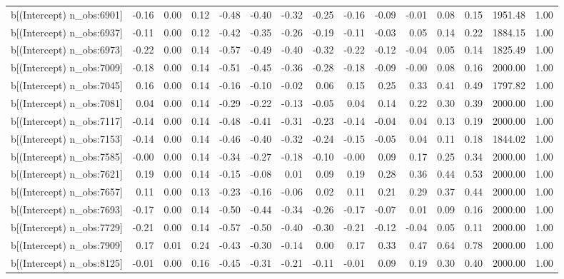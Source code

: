 \begin{table}[ht]
\begin{tabular}{rrrrrrrrrrrrrrr}
  b[(Intercept) n\_obs:6901] & -0.16 & 0.00 & 0.12 & -0.48 & -0.40 & -0.32 & -0.25 & -0.16 & -0.09 & -0.01 & 0.08 & 0.15 & 1951.48 & 1.00 \\ 
  b[(Intercept) n\_obs:6937] & -0.11 & 0.00 & 0.12 & -0.42 & -0.35 & -0.26 & -0.19 & -0.11 & -0.03 & 0.05 & 0.14 & 0.22 & 1884.15 & 1.00 \\ 
  b[(Intercept) n\_obs:6973] & -0.22 & 0.00 & 0.14 & -0.57 & -0.49 & -0.40 & -0.32 & -0.22 & -0.12 & -0.04 & 0.05 & 0.14 & 1825.49 & 1.00 \\ 
  b[(Intercept) n\_obs:7009] & -0.18 & 0.00 & 0.14 & -0.51 & -0.45 & -0.36 & -0.28 & -0.18 & -0.09 & -0.00 & 0.08 & 0.16 & 2000.00 & 1.00 \\ 
  b[(Intercept) n\_obs:7045] & 0.16 & 0.00 & 0.14 & -0.16 & -0.10 & -0.02 & 0.06 & 0.15 & 0.25 & 0.33 & 0.41 & 0.49 & 1797.82 & 1.00 \\ 
  b[(Intercept) n\_obs:7081] & 0.04 & 0.00 & 0.14 & -0.29 & -0.22 & -0.13 & -0.05 & 0.04 & 0.14 & 0.22 & 0.30 & 0.39 & 2000.00 & 1.00 \\ 
  b[(Intercept) n\_obs:7117] & -0.14 & 0.00 & 0.14 & -0.48 & -0.41 & -0.31 & -0.23 & -0.14 & -0.04 & 0.04 & 0.13 & 0.19 & 2000.00 & 1.00 \\ 
  b[(Intercept) n\_obs:7153] & -0.14 & 0.00 & 0.14 & -0.46 & -0.40 & -0.32 & -0.24 & -0.15 & -0.05 & 0.04 & 0.11 & 0.18 & 1844.02 & 1.00 \\ 
  b[(Intercept) n\_obs:7585] & -0.00 & 0.00 & 0.14 & -0.34 & -0.27 & -0.18 & -0.10 & -0.00 & 0.09 & 0.17 & 0.25 & 0.34 & 2000.00 & 1.00 \\ 
  b[(Intercept) n\_obs:7621] & 0.19 & 0.00 & 0.14 & -0.15 & -0.08 & 0.01 & 0.09 & 0.19 & 0.28 & 0.36 & 0.44 & 0.53 & 2000.00 & 1.00 \\ 
  b[(Intercept) n\_obs:7657] & 0.11 & 0.00 & 0.13 & -0.23 & -0.16 & -0.06 & 0.02 & 0.11 & 0.21 & 0.29 & 0.37 & 0.44 & 2000.00 & 1.00 \\ 
  b[(Intercept) n\_obs:7693] & -0.17 & 0.00 & 0.14 & -0.50 & -0.44 & -0.34 & -0.26 & -0.17 & -0.07 & 0.01 & 0.09 & 0.16 & 2000.00 & 1.00 \\ 
  b[(Intercept) n\_obs:7729] & -0.21 & 0.00 & 0.14 & -0.57 & -0.50 & -0.40 & -0.30 & -0.21 & -0.12 & -0.04 & 0.05 & 0.11 & 2000.00 & 1.00 \\ 
  b[(Intercept) n\_obs:7909] & 0.17 & 0.01 & 0.24 & -0.43 & -0.30 & -0.14 & 0.00 & 0.17 & 0.33 & 0.47 & 0.64 & 0.78 & 2000.00 & 1.00 \\ 
  b[(Intercept) n\_obs:8125] & -0.01 & 0.00 & 0.16 & -0.45 & -0.31 & -0.21 & -0.11 & -0.01 & 0.09 & 0.19 & 0.30 & 0.40 & 2000.00 & 1.00 \\ 

\end{tabular}
\end{table}
